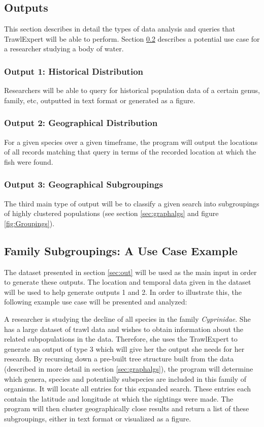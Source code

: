 \documentclass{article}
\begin{document}
\subsection{Outputs}

This section describes in detail the types of data analysis and queries that TrawlExpert will be able to perform. Section \ref{sec:case} describes a potential use case for a researcher studying a body of water.

\subsubsection{Output 1: Historical Distribution}
Researchers will be able to query for historical population data of a certain genus, family, etc, outputted in text format or generated as a figure.

\subsubsection{Output 2: Geographical Distribution}
For a given species over a given timeframe, the program will output the locations of all records matching that query in terms of the recorded location at which the fish were found.

\subsubsection{Output 3: Geographical Subgroupings}\label{sec:subgroup}
The third main type of output will be to classify a given search into subgroupings of highly clustered populations (see section \ref{sec:graphalgs} and figure \ref{fig:Groupings}).

\subsection{Family Subgroupings: A Use Case Example}\label{sec:case}
The dataset presented in section \ref{sec:out} will be used as the main input in order to generate these outputs. The location and temporal data given in the dataset will be used to help generate outputs 1 and 2. In order to illustrate this, the following example use case will be presented and analyzed:

A researcher is studying the decline of all species in the family \textit{Cyprinidae}. She has a large dataset of trawl data and wishes to obtain information about the related subpopulations in the data. Therefore, she uses the TrawlExpert to generate an output of type 3 which will give her the output she needs for her research. By recursing down a pre-built tree structure built from the data (described in more detail in section \ref{sec:graphalgs}), the program will determine which genera, species and potentially subspecies are included in this family of organisms. It will locate all entries for this expanded search. These entries each contain the latitude and longitude at which the sightings were made. The program will then cluster geographically close results and return a list of these subgroupings, either in text format or visualized as a figure.
\end{document}
